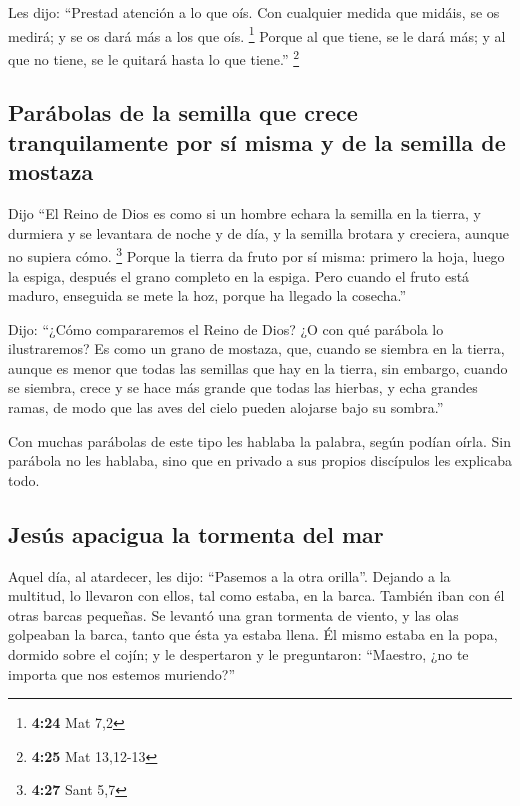  Les dijo: ``Prestad atención a lo que oís. Con cualquier
medida que midáis, se os medirá; y se os dará más a los que oís.
\footnote{\textbf{4:24} Mat 7,2}  Porque al que tiene, se
le dará más; y al que no tiene, se le quitará hasta lo que tiene.''
\footnote{\textbf{4:25} Mat 13,12-13}

\hypertarget{paruxe1bolas-de-la-semilla-que-crece-tranquilamente-por-suxed-misma-y-de-la-semilla-de-mostaza}{%
\subsection{Parábolas de la semilla que crece tranquilamente por sí
misma y de la semilla de
mostaza}\label{paruxe1bolas-de-la-semilla-que-crece-tranquilamente-por-suxed-misma-y-de-la-semilla-de-mostaza}}

 Dijo ``El Reino de Dios es como si un hombre echara la
semilla en la tierra,  y durmiera y se levantara de noche
y de día, y la semilla brotara y creciera, aunque no supiera cómo.
\footnote{\textbf{4:27} Sant 5,7}  Porque la tierra da
fruto por sí misma: primero la hoja, luego la espiga, después el grano
completo en la espiga.  Pero cuando el fruto está maduro,
enseguida se mete la hoz, porque ha llegado la cosecha.''

 Dijo: ``¿Cómo compararemos el Reino de Dios? ¿O con qué
parábola lo ilustraremos?  Es como un grano de mostaza,
que, cuando se siembra en la tierra, aunque es menor que todas las
semillas que hay en la tierra,  sin embargo, cuando se
siembra, crece y se hace más grande que todas las hierbas, y echa
grandes ramas, de modo que las aves del cielo pueden alojarse bajo su
sombra.''

 Con muchas parábolas de este tipo les hablaba la
palabra, según podían oírla.  Sin parábola no les
hablaba, sino que en privado a sus propios discípulos les explicaba
todo.

\hypertarget{jesuxfas-apacigua-la-tormenta-del-mar}{%
\subsection{Jesús apacigua la tormenta del
mar}\label{jesuxfas-apacigua-la-tormenta-del-mar}}

 Aquel día, al atardecer, les dijo: ``Pasemos a la otra
orilla''.  Dejando a la multitud, lo llevaron con ellos,
tal como estaba, en la barca. También iban con él otras barcas pequeñas.
 Se levantó una gran tormenta de viento, y las olas
golpeaban la barca, tanto que ésta ya estaba llena.  Él
mismo estaba en la popa, dormido sobre el cojín; y le despertaron y le
preguntaron: ``Maestro, ¿no te importa que nos estemos muriendo?''


